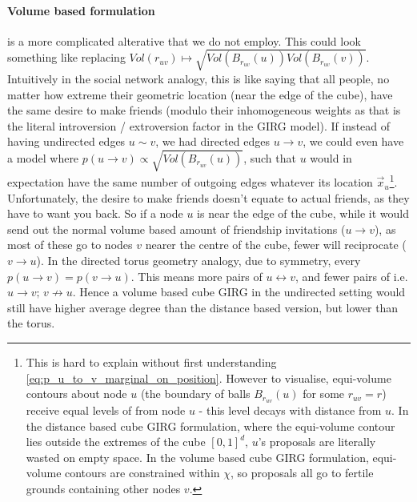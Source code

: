 \paragraph{Volume based formulation} is a more complicated alterative that we do not employ. This could look something like replacing $Vol(r_{uv}) \mapsto \sqrt{Vol(B_{r_{uv}}(u)) Vol(B_{r_{uv}}(v))}$.
Intuitively in the social network analogy, this is like saying that all people, no matter how extreme their geometric location (near the edge of the cube), have the same desire to make friends (modulo their inhomogeneous weights as that is the literal introversion / extroversion factor in the GIRG model). 
If instead of having undirected edges $u \sim v$, we had directed edges $u \to v$, we could even have a model where $p(u \to v) \propto \sqrt{Vol(B_{r_{uv}}(u))}$, such that $u$ would in expectation have the same number of outgoing edges whatever its location $\vec{x}_u$\footnote{This is hard to explain without first understanding \cref{eq:p_u_to_v_marginal_on_position}. However to visualise, equi-volume contours about node $u$ (the boundary of balls $B_{r_{uv}}(u)$ for some $r_{uv}=r$) receive equal levels of  from node $u$ - this level decays with distance from $u$. In the distance based cube GIRG formulation, where the equi-volume contour lies outside the extremes of the cube $[0,1]^d$, $u$'s proposals are literally wasted on empty space. In the volume based cube GIRG formulation, equi-volume contours are constrained within $\chi$, so proposals all go to fertile grounds containing other nodes $v$.}.
Unfortunately, the desire to make friends doesn't equate to actual friends, as they have to want you back.
So if a node $u$ is near the edge of the cube, while it would send out the normal volume based amount of friendship invitations ($u \to v$), as most of these go to nodes $v$ nearer the centre of the cube, fewer will reciprocate ($v \to u$). In the directed torus geometry analogy, due to symmetry, every $p(u \to v) = p(v \to u)$. This means more pairs of $u \leftrightarrow v$, and fewer pairs of  i.e. $u \to v;\, v \not\to u$.
Hence a volume based cube GIRG in the undirected setting would still have higher average degree than the distance based version, but lower than the torus.

